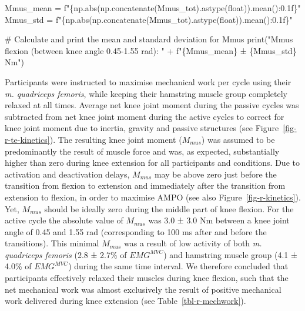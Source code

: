 \documentclass[
  11pt,
  a4paper]{article}
\newenvironment{Shaded}{\begin{snugshade}}{\end{snugshade}}
\newcommand{\BuiltInTok}[1]{\textcolor[rgb]{0.00,0.23,0.31}{#1}}
\newcommand{\CommentTok}[1]{\textcolor[rgb]{0.37,0.37,0.37}{#1}}
\newcommand{\NormalTok}[1]{\textcolor[rgb]{0.00,0.23,0.31}{#1}}
\newcommand{\OperatorTok}[1]{\textcolor[rgb]{0.37,0.37,0.37}{#1}}
\newcommand{\SpecialCharTok}[1]{\textcolor[rgb]{0.37,0.37,0.37}{#1}}
\newcommand{\SpecialStringTok}[1]{\textcolor[rgb]{0.13,0.47,0.30}{#1}}
\newcommand{\StringTok}[1]{\textcolor[rgb]{0.13,0.47,0.30}{#1}}
\begin{document}
\begin{Shaded}
\begin{Highlighting}[]
\NormalTok{Mmus\_mean }\OperatorTok{=} \SpecialStringTok{f"}\SpecialCharTok{\{}\NormalTok{np}\SpecialCharTok{.}\BuiltInTok{abs}\NormalTok{(np.concatenate(Mmus\_tot).astype(}\BuiltInTok{float}\NormalTok{))}\SpecialCharTok{.}\NormalTok{mean()}\SpecialCharTok{:0.1f\}}\SpecialStringTok{"}
\NormalTok{Mmus\_std }\OperatorTok{=} \SpecialStringTok{f"}\SpecialCharTok{\{}\NormalTok{np}\SpecialCharTok{.}\BuiltInTok{abs}\NormalTok{(np.concatenate(Mmus\_tot).astype(}\BuiltInTok{float}\NormalTok{))}\SpecialCharTok{.}\NormalTok{mean()}\SpecialCharTok{:0.1f\}}\SpecialStringTok{"}

\CommentTok{\# Calculate and print the mean and standard deviation for Mmus}
\BuiltInTok{print}\NormalTok{(}\StringTok{"Mmus flexion (between knee angle 0.45{-}1.55 rad): "} \OperatorTok{+}
      \SpecialStringTok{f"}\SpecialCharTok{\{}\NormalTok{Mmus\_mean}\SpecialCharTok{\}}\SpecialStringTok{ ± }\SpecialCharTok{\{}\NormalTok{Mmus\_std}\SpecialCharTok{\}}\SpecialStringTok{ Nm"}\NormalTok{)}
\end{Highlighting}
\end{Shaded}

Participants were instructed to maximise mechanical work per cycle using
their \emph{m. quadriceps femoris}, while keeping their hamstring muscle
group completely relaxed at all times. Average net knee joint moment
during the passive cycles was subtracted from net knee joint moment
during the active cycles to correct for knee joint moment due to
inertia, gravity and passive structures (see
Figure~\ref{fig-r-te-kinetics}). The resulting knee joint moment
(\(M_{mus}\)) was assumed to be predominantly the result of muscle force
and was, as expected, substantially higher than zero during knee
extension for all participants and conditions. Due to activation and
deactivation delays, \(M_{mus}\) may be above zero just before the
transition from flexion to extension and immediately after the
transition from extension to flexion, in order to maximise AMPO (see
also Figure~\ref{fig-r-kinetics}). Yet, \(M_{mus}\) should be ideally
zero during the middle part of knee flexion. For the active cycle the
absolute value of \(M_{mus}\) was 3.0 ± 3.0 Nm between a knee joint
angle of 0.45 and 1.55 rad (corresponding to 100 ms after and before the
transitions). This minimal \(M_{mus}\) was a result of low activity of
both \emph{m. quadriceps femoris} (2.8 ± 2.7\% of \(EMG^{MVC}\)) and
hamstring muscle group (4.1 ± 4.0\% of \(EMG^{MVC}\)) during the same
time interval. We therefore concluded that participants effectively
relaxed their muscles during knee flexion, such that the net mechanical
work was almost exclusively the result of positive mechanical work
delivered during knee extension (see Table~\ref{tbl-r-mechwork}).
\end{document}
